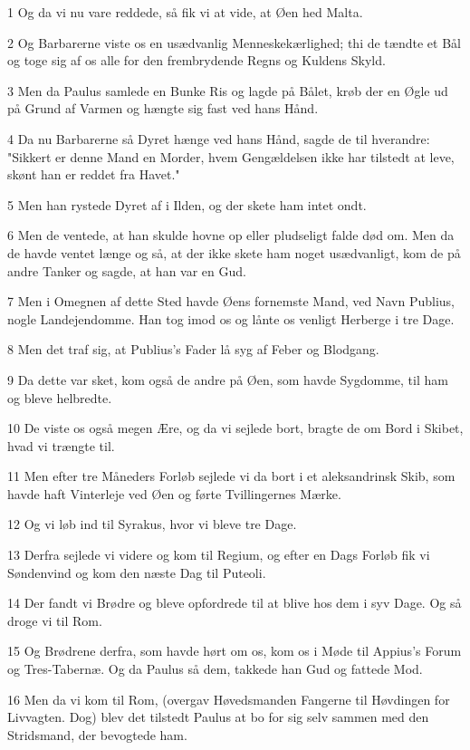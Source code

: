 \par 1 Og da vi nu vare reddede, så fik vi at vide, at Øen hed Malta.
\par 2 Og Barbarerne viste os en usædvanlig Menneskekærlighed; thi de tændte et Bål og toge sig af os alle for den frembrydende Regns og Kuldens Skyld.
\par 3 Men da Paulus samlede en Bunke Ris og lagde på Bålet, krøb der en Øgle ud på Grund af Varmen og hængte sig fast ved hans Hånd.
\par 4 Da nu Barbarerne så Dyret hænge ved hans Hånd, sagde de til hverandre: "Sikkert er denne Mand en Morder, hvem Gengældelsen ikke har tilstedt at leve, skønt han er reddet fra Havet."
\par 5 Men han rystede Dyret af i Ilden, og der skete ham intet ondt.
\par 6 Men de ventede, at han skulde hovne op eller pludseligt falde død om. Men da de havde ventet længe og så, at der ikke skete ham noget usædvanligt, kom de på andre Tanker og sagde, at han var en Gud.
\par 7 Men i Omegnen af dette Sted havde Øens fornemste Mand, ved Navn Publius, nogle Landejendomme. Han tog imod os og lånte os venligt Herberge i tre Dage.
\par 8 Men det traf sig, at Publius's Fader lå syg af Feber og Blodgang.
\par 9 Da dette var sket, kom også de andre på Øen, som havde Sygdomme, til ham og bleve helbredte.
\par 10 De viste os også megen Ære, og da vi sejlede bort, bragte de om Bord i Skibet, hvad vi trængte til.
\par 11 Men efter tre Måneders Forløb sejlede vi da bort i et aleksandrinsk Skib, som havde haft Vinterleje ved Øen og førte Tvillingernes Mærke.
\par 12 Og vi løb ind til Syrakus, hvor vi bleve tre Dage.
\par 13 Derfra sejlede vi videre og kom til Regium, og efter en Dags Forløb fik vi Søndenvind og kom den næste Dag til Puteoli.
\par 14 Der fandt vi Brødre og bleve opfordrede til at blive hos dem i syv Dage. Og så droge vi til Rom.
\par 15 Og Brødrene derfra, som havde hørt om os, kom os i Møde til Appius's Forum og Tres-Tabernæ. Og da Paulus så dem, takkede han Gud og fattede Mod.
\par 16 Men da vi kom til Rom, (overgav Høvedsmanden Fangerne til Høvdingen for Livvagten. Dog) blev det tilstedt Paulus at bo for sig selv sammen med den Stridsmand, der bevogtede ham.
